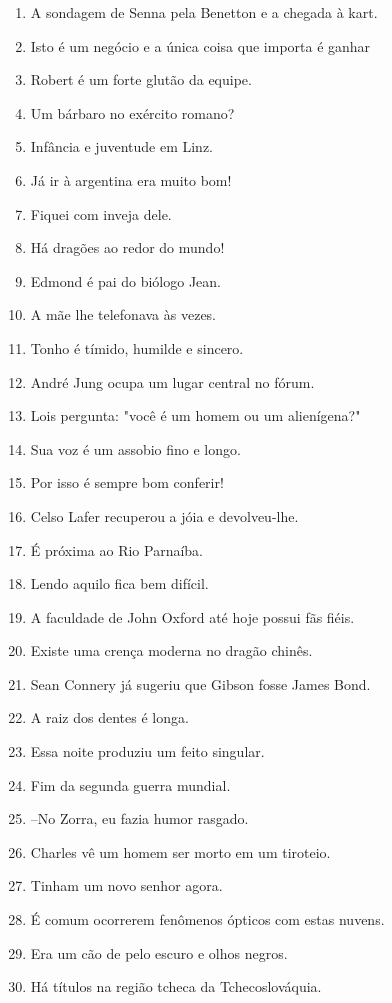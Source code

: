 \begin{enumerate}
\item A sondagem de Senna pela Benetton e a chegada \`a kart.
\item Isto \'e um neg\'ocio e a \'unica coisa que importa \'e ganhar
\item Robert \'e um forte glut\~ao da equipe.
\item Um b\'arbaro no ex\'ercito romano?
\item Inf\^ancia e juventude em Linz.
\item J\'a ir \`a argentina era muito bom!
\item Fiquei com inveja dele.
\item H\'a drag\~oes ao redor do mundo!
\item Edmond \'e pai do bi\'ologo Jean.
\item A m\~ae lhe telefonava \`as vezes.
\item Tonho \'e t\'imido, humilde e sincero.
\item Andr\'e Jung ocupa um lugar central no f\'orum.
\item Lois pergunta: "voc\^e \'e um homem ou um alien\'igena?"
\item Sua voz \'e um assobio fino e longo.
\item Por isso \'e sempre bom conferir!
\item Celso Lafer recuperou a j\'oia e devolveu-lhe.
\item \'E pr\'oxima ao Rio Parna\'iba.
\item Lendo aquilo fica bem dif\'icil.
\item A faculdade de John Oxford at\'e hoje possui f\~as fi\'eis.
\item Existe uma cren\c{c}a moderna no drag\~ao chin\^es.
\item Sean Connery j\'a sugeriu que Gibson fosse James Bond.
\item A raiz dos dentes \'e longa.
\item Essa noite produziu um feito singular.
\item Fim da segunda guerra mundial.
\item --No Zorra, eu fazia humor rasgado.
\item Charles v\^e um homem ser morto em um tiroteio.
\item Tinham um novo senhor agora.
\item \'E comum ocorrerem fen\^omenos \'opticos com estas nuvens.
\item Era um c\~ao de pelo escuro e olhos negros.
\item H\'a t\'itulos na regi\~ao tcheca da Tchecoslov\'aquia.

\end{enumerate}
